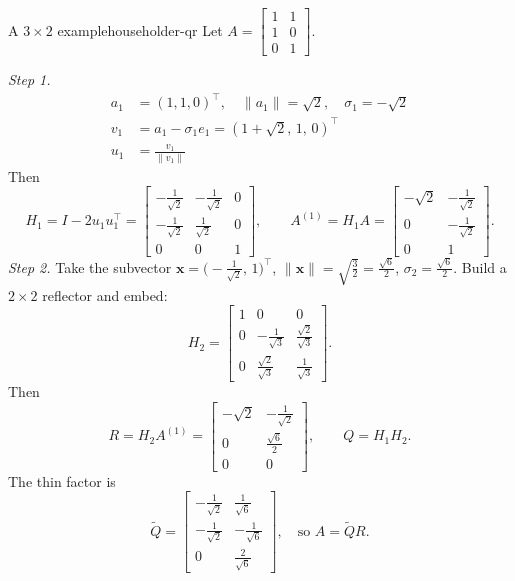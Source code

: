 \begin{example}{A $3\times 2$ example}{householder-qr}
    Let $A=\begin{bmatrix}1&1\\1&0\\0&1\end{bmatrix}$.

    \emph{Step 1.}
    \begin{align*}
        a_1 & =(1,1,0)^\top, \quad \|a_1\|=\sqrt2,\quad \sigma_1=-\sqrt2 \\
        v_1 & =a_1-\sigma_1 e_1=(1+\sqrt2,\,1,\,0)^\top                  \\
        u_1 & =\frac{v_1}{\|v_1\|}
    \end{align*}
    Then
    \[
        H_1=I-2u_1u_1^\top
        =\begin{bmatrix}
            -\tfrac{1}{\sqrt2} & -\tfrac{1}{\sqrt2} & 0 \\
            -\tfrac{1}{\sqrt2} & \tfrac{1}{\sqrt2}  & 0 \\
            0                  & 0                  & 1
        \end{bmatrix},
        \qquad
        A^{(1)}=H_1A=
        \begin{bmatrix}
            -\sqrt2 & -\tfrac{1}{\sqrt2} \\
            0       & -\tfrac{1}{\sqrt2} \\
            0       & 1
        \end{bmatrix}.
    \]
    \emph{Step 2.} Take the subvector $\mathbf{x}=\bigl(-\tfrac{1}{\sqrt2},\,1\bigr)^\top$, $\|\mathbf{x}\|=\sqrt{\tfrac32}=\tfrac{\sqrt6}{2}$, $\sigma_2=\tfrac{\sqrt6}{2}$.
    Build a $2\times2$ reflector and embed:
    \[
        H_2=
        \begin{bmatrix}
            1 & 0                      & 0                      \\
            0 & -\tfrac{1}{\sqrt3}     & \tfrac{\sqrt2}{\sqrt3} \\
            0 & \tfrac{\sqrt2}{\sqrt3} & \tfrac{1}{\sqrt3}
        \end{bmatrix}.
    \]
    Then
    \[
        R=H_2A^{(1)}=
        \begin{bmatrix}
            -\sqrt2 & -\tfrac{1}{\sqrt2} \\
            0       & \tfrac{\sqrt6}{2}  \\
            0       & 0
        \end{bmatrix},
        \qquad
        Q=H_1H_2.
    \]
    The thin factor is
    \[
        \widetilde{Q}=\begin{bmatrix}
            -\tfrac{1}{\sqrt2} & \tfrac{1}{\sqrt6}  \\
            -\tfrac{1}{\sqrt2} & -\tfrac{1}{\sqrt6} \\
            0                  & \tfrac{2}{\sqrt6}
        \end{bmatrix},
        \quad
        \text{so }A=\widetilde{Q}R.
    \]
\end{example}

